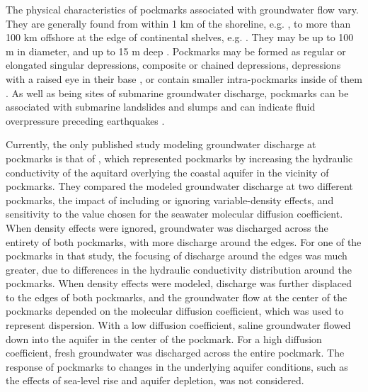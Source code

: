 \documentclass[draft, 10pt]{agujournal2019}
\begin{document}
The physical characteristics of pockmarks associated with groundwater flow vary. They are generally found from within 1 km of the shoreline, e.g. , to more than 100 km offshore at the edge of continental shelves, e.g. . They may be up to 100 m in diameter, and up to 15 m deep \cite{micallef_can_2023}. Pockmarks may be formed as regular or elongated singular depressions, composite or chained depressions, depressions with a raised eye in their base \cite{hovland_significance_2002}, or contain smaller intra-pockmarks inside of them \cite{hoffmann_complex_2020}. As well as being sites of submarine groundwater discharge, pockmarks can be associated with submarine landslides and slumps and can indicate fluid overpressure preceding earthquakes \cite{hovland_significance_2002}.  

Currently, the only published study modeling groundwater discharge at pockmarks is that of , which represented pockmarks by increasing the hydraulic conductivity of the aquitard overlying the coastal aquifer in the vicinity of pockmarks. They compared the modeled groundwater discharge at two different pockmarks, the impact of including or ignoring variable-density effects, and sensitivity to the value chosen for the seawater molecular diffusion coefficient. When density effects were ignored, groundwater was discharged across the entirety of both pockmarks, with more discharge around the edges. For one of the pockmarks in that study, the focusing of discharge around the edges was much greater, due to differences in the hydraulic conductivity distribution around the pockmarks. When density effects were modeled, discharge was further displaced to the edges of both pockmarks, and the groundwater flow at the center of the pockmarks depended on the molecular diffusion coefficient, which was used to represent dispersion. With a low diffusion coefficient, saline groundwater flowed down into the aquifer in the center of the pockmark. For a high diffusion coefficient, fresh groundwater was discharged across the entire pockmark. The response of pockmarks to changes in the underlying aquifer conditions, such as the effects of sea-level rise and aquifer depletion, was not considered.
\end{document}
